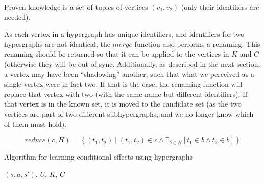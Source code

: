 \documentclass[../Master.tex]{subfiles}
\begin{document}
Proven knowledge is a set of tuples of vertices $(v_1, v_2)$ (only their identifiers are needed).

As each vertex in a hypergraph has unique identifiers, and identifiers for two hypergraphs are not identical, the $merge$ function also performs a renaming. This renaming should be returned so that it can be applied to the vertices in $K$ and $C$ (otherwise they will be out of sync. Additionally, as described in the next section, a vertex may have been ``shadowing'' another, such that what we perceived as a single vertex were in fact two. If that is the case, the renaming function will replace that vertex with two (with the same name but different identifiers). If that vertex is in the known set, it is moved to the candidate set (as the two vertices are part of two different subhypergraphs, and we no longer know which of them must hold).

\begin{equation*}
    reduce(c, H) =
    \left\{ \left( t_1, t_2 \right) \mid 
        \left( t_1, t_2 \right) \in c \land 
        \exists_{b \in H} \left[ t_1 \in b \land t_2 \in b \right] 
    \right\}
\end{equation*}

\begin{algorithm}
    \caption{Algorithm for learning conditional effects using hypergraphs}\label{algo:CondEffLearn}
    \begin{algorithmic}
            \EndFor
            \EndFor
        \EndFunction

         {$\left( s, a, s'\right)$, $U$, $K$, $C$}
            \EndFor
            \State{}
        \EndFunction%
    \end{algorithmic}
\end{algorithm}
\end{document}

